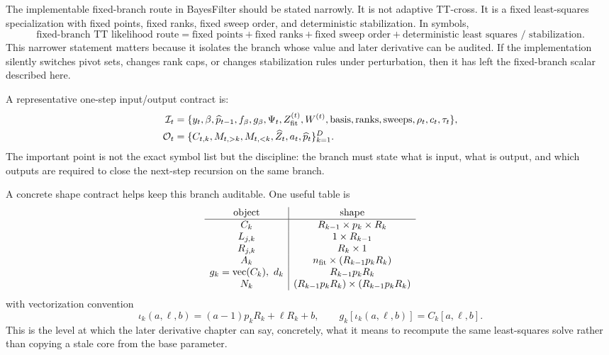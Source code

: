 The implementable fixed-branch route in BayesFilter should be stated narrowly.
It is not adaptive TT-cross.  It is a fixed least-squares specialization with
fixed points, fixed ranks, fixed sweep order, and deterministic stabilization.
In symbols,
\begin{equation}
  \text{fixed-branch TT likelihood route}
  =
  \text{fixed points}
  +
  \text{fixed ranks}
  +
  \text{fixed sweep order}
  +
  \text{deterministic least squares / stabilization}.
  \label{eq:bf-hd-squared-tt-fixed-ls-summary}
\end{equation}
This narrower statement matters because it isolates the branch whose value and
later derivative can be audited.  If the implementation silently switches pivot
sets, changes rank caps, or changes stabilization rules under perturbation, then
it has left the fixed-branch scalar described here.

A representative one-step input/output contract is:
\begin{align}
  \mathcal I_t &=
  \{y_t,\beta,\widehat p_{t-1},f_\beta,g_\beta,\Psi_t,Z_{\rm fit}^{(t)},W^{(t)},
    \text{basis},\text{ranks},\text{sweeps},\rho_t,c_t,\tau_t\},
  \label{eq:bf-hd-squared-tt-inputs}\\
  \mathcal O_t &=
  \{C_{t,k},M_{t,>k},M_{t,<k},\widehat Z_t,a_t,\widehat p_t\}_{k=1}^D.
  \label{eq:bf-hd-squared-tt-outputs}
\end{align}
The important point is not the exact symbol list but the discipline: the branch
must state what is input, what is output, and which outputs are required to
close the next-step recursion on the same branch.

A concrete shape contract helps keep this branch auditable.  One useful table is
\begin{equation}
\begin{array}{c|c}
\text{object} & \text{shape}\\
\hline
C_k & R_{k-1}\times p_k\times R_k\\
L_{j,k} & 1\times R_{k-1}\\
R_{j,k} & R_k\times 1\\
A_k & n_{\rm fit}\times (R_{k-1}p_kR_k)\\
g_k=\operatorname{vec}(C_k),\ d_k & R_{k-1}p_kR_k\\
N_k & (R_{k-1}p_kR_k)\times (R_{k-1}p_kR_k)
\end{array}
  \label{eq:bf-hd-squared-tt-shape-table}
\end{equation}
with vectorization convention
\begin{equation}
  \iota_k(a,\ell,b)=
  (a-1)p_kR_k+\ell R_k+b,
  \qquad
  g_k[\iota_k(a,\ell,b)]=C_k[a,\ell,b].
  \label{eq:bf-hd-squared-tt-flattening}
\end{equation}
This is the level at which the later derivative chapter can say, concretely, what
it means to recompute the same least-squares solve rather than copying a stale
core from the base parameter.

